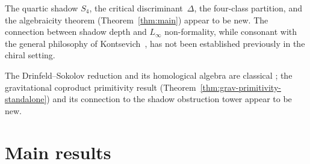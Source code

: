 \documentclass[11pt,reqno]{amsart}
\theoremstyle{definition}
\theoremstyle{remark}
\numberwithin{equation}{section}
\begin{document}
The quartic shadow $S_4$, the critical discriminant~$\Delta$,
the four-class partition, and the algebraicity theorem
(Theorem~\ref{thm:main}) appear to be new. The connection
between shadow depth and $L_\infty$ non-formality, while
consonant with the general philosophy of Kontsevich~\cite{Kontsevich03},
has not been established previously in the chiral setting.

The Drinfeld--Sokolov reduction and its homological algebra are
classical \cite{KRW03, FF90, DS85};
the gravitational coproduct primitivity result
(Theorem~\ref{thm:grav-primitivity-standalone}) and its connection to the
shadow obstruction tower appear to be new.


\def\shadowtowervtwoincluded{1}


\section{Main results}\label{sec:main-results}
\end{document}
